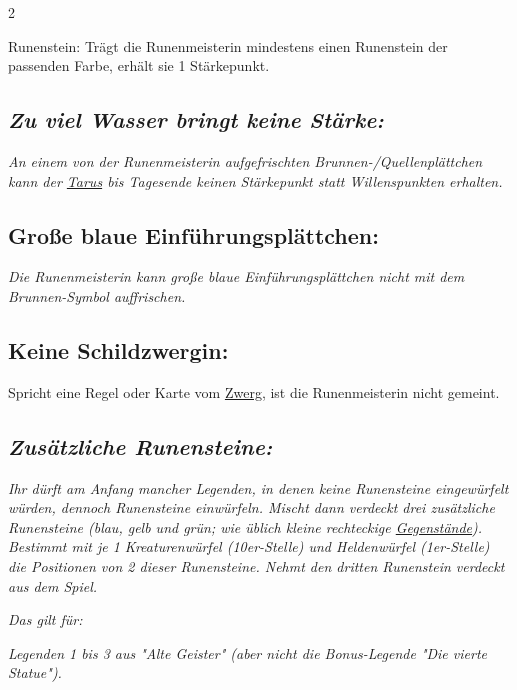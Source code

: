 \documentclass[10pt, a4paper, oneside]{book}
\newcommand{\fan}[1]{\textit{#1}}
\begin{document}
\begin{multicols*}{2}
\begin{nobgcolor}
\bullet{} Runenstein: Trägt die Runenmeisterin mindestens einen Runenstein der passenden Farbe, erhält sie 1 Stärkepunkt.
\supercite{89598}



\subsection{\fan{Zu viel Wasser bringt keine Stärke:}}

\fan{An einem von der Runenmeisterin aufgefrischten Brunnen-/Quellenplättchen kann der \hyperref[Tarus]{Tarus} bis Tagesende keinen Stärkepunkt statt Willenspunkten erhalten.}
\supercite{137438}


\columnbreak

\subsection{Große blaue Einführungsplättchen:}

\fan{Die Runenmeisterin kann große blaue Einführungsplättchen nicht mit dem Brunnen-Symbol auffrischen.}




\subsection{Keine Schildzwergin:}

Spricht eine Regel oder Karte vom \hyperref[Zwerg]{Zwerg}, ist die Runenmeisterin nicht gemeint.




\columnbreak




\subsection{\fan{Zusätzliche Runensteine:}}

\fan{Ihr dürft am Anfang mancher Legenden, in denen keine Runensteine eingewürfelt würden, dennoch Runensteine einwürfeln. Mischt dann verdeckt drei zusätzliche Runensteine (blau, gelb und grün; wie üblich kleine rechteckige \hyperref[Gegenstände und Sonderplättchen]{Gegenstände}). Bestimmt mit je 1 Kreaturenwürfel (10er-Stelle) und Heldenwürfel (1er-Stelle) die Positionen von 2 dieser Runensteine. Nehmt den dritten Runenstein verdeckt aus dem Spiel.}
\supercite{128652}

\fan{Das gilt für:}


\bullet{} \fan{Legenden 1 bis 3 aus "Alte Geister" (aber nicht die Bonus-Legende "Die vierte Statue").}


\end{nobgcolor}
\end{multicols*}
\end{document}

